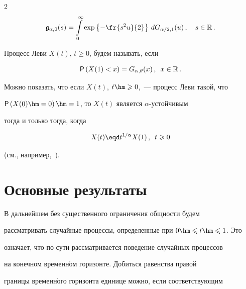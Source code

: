 \begin{multicols}{2}
\begin{equation*}

\mathfrak{g}_{\alpha,0}(s)=\int\limits_{0}^{\infty}\exp

\left\{-\fr{s^2u}{2}\right\}\,dG_{\alpha/2,1}(u)\,,\

\ \ s\in\mathbb{R}\,.


\end{equation*}



Процесс Леви $X(t)$, $t\geqslant0$, будем называть, если

$$

{\sf P}\left(X(1)<x\right)=G_{\alpha,\theta}(x)\,,\enskip x\in\mathbb{R}\,.

$$

Можно показать, что если $X(t)$, $t\hm\geqslant0$,~--- процесс Леви такой, что

${\sf P}\left(X(0)\hm=0\right)\hm=1$, то $X(t)$ является $\alpha$-устой\-чи\-вым

тогда и только тогда, когда

\begin{equation}

X(t)\eqd t^{1/\alpha}X(1)\,,\enskip t\geqslant0

\label{e5-zaks}

\end{equation}

(см., например,~\cite{EmbrechtsMaejima2002}).



\section{Основные результаты}



В дальнейшем без существенного ограничения общности будем

рассматривать случайные процессы, определенные при $0\hm\leqslant t\hm\leqslant1$. Это

означает, что по сути рассматривается поведение случайных процессов

на конечном временн$\acute{\mbox{о}}$м горизонте. Добиться равенства правой

границы временн$\acute{\mbox{о}}$го горизонта единице можно, если соответствующим


\end{multicols}
